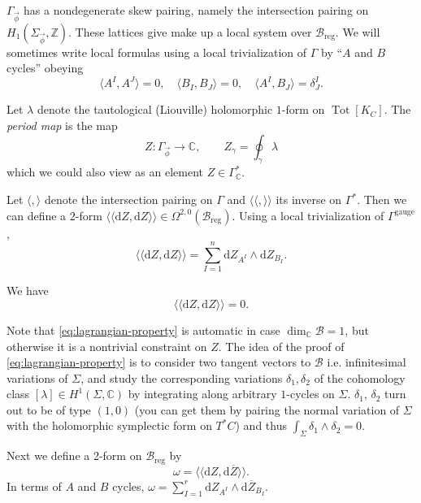 \documentclass[12pt,letterpaper,reqno]{article}
\numberwithin{equation}{section}
\newcommand{\cB}{\ensuremath{\mathcal B}}
\newcommand{\bbZ}{\ensuremath{\mathbb Z}}
\newcommand{\bbC}{\ensuremath{\mathbb C}}
\newcommand{\kahler}{K\"ahler\xspace}
\newcommand{\de}{\mathrm{d}}
\newcommand{\reg}{\mathrm{reg}}
\newcommand{\gauge}{\mathrm{gauge}}
\newcommand{\IP}[1]{\langle#1\rangle}
\newcommand{\DIP}[1]{\langle\!\langle#1\rangle\!\rangle}
\newcommand{\vphi}{{\vec\phi}}
\newcommand{\ti}[1]{\textit{#1}}
\DeclareMathOperator{\Tot}{Tot}
\newcommand{\fixme}[1]{{\color{orange}{[#1]}}}
\begin{document}
$\Gamma_\vphi$ has a nondegenerate skew pairing,
namely the 
intersection pairing on $H_1(\Sigma_\vphi, \bbZ)$.
These lattices give make up a local system over $\cB_\reg$.
We will sometimes write local formulas using a local
trivialization of $\Gamma$ by ``$A$ and $B$ cycles''
obeying
\begin{equation}
  \IP{A^I, A^J}=0, \quad \IP{B_I, B_J}=0, \quad \IP{A^I,B_J} = \delta^I_J.
\end{equation}

\fixme{discuss $SU(K)$ case}

\begin{defn}
Let $\lambda$ denote the tautological (Liouville) holomorphic $1$-form
on $\Tot[K_C]$.
The \ti{period map} is the map
\begin{equation}
   Z: \Gamma_\vphi \to \bbC, \qquad Z_\gamma = \oint_\gamma \lambda
\end{equation}
which we could also view as an element $Z \in \Gamma^*_\bbC$.
\end{defn}
Let $\IP{,}$ denote the intersection pairing on $\Gamma$
and $\DIP{,}$ its inverse on $\Gamma^*$.
Then we can define a $2$-form
$\DIP{\de Z,  \de Z} \in \Omega^{2,0}(\cB_\reg)$.
Using a local trivialization of $\Gamma^\gauge$,
\begin{equation}
  \DIP{\de Z,  \de Z} = \sum_{I=1}^n \de Z_{A^I} \wedge \de Z_{B_I}.
\end{equation}

\begin{prop} We have
\begin{equation}  \label{eq:lagrangian-property}
\DIP{\de Z, \de Z} = 0.
\end{equation}
\end{prop}

Note that \eqref{eq:lagrangian-property} is automatic in case
$\dim_\bbC \cB = 1$, but otherwise it is a nontrivial
constraint on $Z$. The idea of the proof
of \eqref{eq:lagrangian-property} is to consider two
tangent vectors to $\cB$ i.e. infinitesimal variations 
of $\Sigma$, and study the corresponding variations 
$\delta_1, \delta_2$ of 
the cohomology class $[\lambda] \in H^1(\Sigma,\bbC)$ 
by integrating along arbitrary
$1$-cycles on $\Sigma$. $\delta_1$, $\delta_2$ turn out to be
of type $(1,0)$
(you can get them by pairing the normal variation of $\Sigma$
with the holomorphic symplectic form on $T^* C$)
and thus
$\int_\Sigma \delta_1 \wedge \delta_2 = 0$.

\begin{defn}[Special \kahler form on $\cB_\reg$]
Next we define a 2-form on $\cB_\reg$ by
\begin{equation}
  \omega = \DIP{\de Z, \de \overline{Z}}.
\end{equation}
In terms of $A$ and $B$ cycles,
$\omega = \sum_{I = 1}^{r} \de Z_{A^I} \wedge \de \overline{Z}_{B_I}$.
\end{defn}
\end{document}
